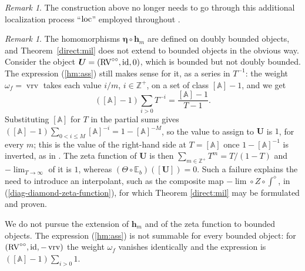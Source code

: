 \documentclass[12pt]{amsart}
\theoremstyle{plain}
\theoremstyle{definition}
\theoremstyle{remark}
\newtheorem{rem}[thm]{Remark}
\numberwithin{equation}{section}
\theoremstyle{plain}
\newcommand{\RV}{\textup{RV}}
\DeclareMathOperator{\id}{id}
\newcommand{\Z}{\mathds{Z}}
\newcommand{\A}{\mathds{A}}
\newcommand{\0}{\emptyset}
\newcommand{\bb}[1]{\mathbb{#1}}
\newcommand{\limplies}{\rightarrow}
\DeclareMathOperator{\vrv}{vrv}
\newcommand{\loc}{\textup{loc}}
\begin{document}
\begin{rem}
The construction above no longer needs to go through this additional localization process ``$\loc$'' employed throughout \cite[\S~8]{hru:loe:lef}.
\end{rem}


\begin{rem}
\label{sec:hm:bounded}
The homomorphisms $\bm \eta \circ \bm h_m$ are defined on doubly bounded objects, and Theorem~\ref{direct:mil} does not extend to bounded objects in the obvious way. Consider the object $\bm U = (\RV^{\circ\circ}, \id, 0)$, which is bounded but not doubly bounded. The expression (\ref{hm:ass}) still makes sense for it, as a series in $T^{-1}$: the weight $\omega_f = \vrv$ takes each value $i/m$, $i \in \Z^+$, on a set of class $[\A] - 1$, and we get
\[
([\A] - 1) \sum_{i > 0} T^{-i} = \frac{[\A] - 1}{T-1}.
\]
Substituting $[\A]$ for $T$ in the partial sums gives $([\A] - 1) \sum_{0 < i \leq M} [\A]^{-i} = 1 - [\A]^{-M}$, so the value to assign to $\bm U$ is $1$, for every $m$; this is the value of the right-hand side at $T = [\A]$ once $1 - [\A]^{-1}$ is inverted, as in \cite[\S~8.2]{hru:loe:lef}. The zeta function of $\bm U$ is then $\sum_{m \in \Z^+} T^m = T / (1 - T)$ and $- \lim_{T \limplies \infty}$ of it is $1$, whereas $(\Theta \circ \bb E_b)([\bm U]) = 0$. Such a failure explains the need to introduce an interpolant, such as the composite map $- \lim \circ Z \circ \int^\diamond$, in (\ref{diag-diamond-zeta-function}), for which Theorem \ref{direct:mil} may be formulated and proven.

We do not pursue the extension of $\bm h_m$ and of the zeta function to bounded objects. The expression (\ref{hm:ass}) is not summable for every bounded object: for $(\RV^{\circ\circ}, \id, -\vrv)$ the weight $\omega_f$ vanishes identically and the expression is $([\A] - 1) \sum_{i > 0} 1$.
\end{rem}
\end{document}
